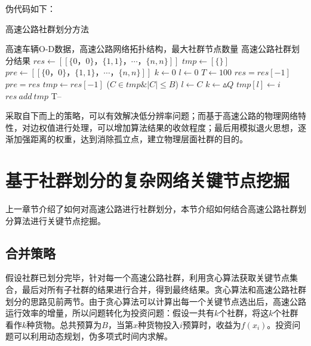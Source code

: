 			伪代码如下：
			\begin{algorithm}[h]
	        \caption{高速公路社群划分方法}  
	        \label{shequn}
	        \begin{algorithmic}[1] %
	            \Require 高速车辆O-D数据，高速公路网络拓扑结构，最大社群节点数量
	            \Ensure 高速公路社群划分结果
	                \State $res\gets [[\{0，0\}，\{1,1\}，\cdots，\{n,n\}]]$ 
	                \State $tmp\gets [\{\}]$
	                \State $pre\gets [[\{0，0\}，\{1,1\}，\cdots，\{n,n\}]]$ 
	                \State $k\gets 0$  
	                \State $l\gets 0$
	                \State $T\gets 100$  
	                	\State $res=res[-1]$
	                	\State $pre=res$
		                	\State $tmp\gets res[-1]$  
		                		\For($C \in tmp \& |C| \le B$)
			                        	\State $l\gets C$  
			                        	\State $k\gets {\vartriangle Q}$  
		                    		\EndIf	
		                		\EndFor
		                    	\State $tmp[l] \gets i$ 
		                	\EndFor
		                	\State $res \ add \ tmp$
	                	\EndWhile
	                	\State T--
	                \EndWhile  
	                \State {}  
	            \EndFunction  
	        \end{algorithmic}  
	    	\end{algorithm} 

			采取自下而上的策略，可以有效解决低分辨率问题；而基于高速公路的物理网络特性，对边权值进行处理，可以增加算法结果的收敛程度；最后用模拟退火思想，逐渐加强距离的权重，达到消除孤立点，建立物理层面社群的目的。

	\section{基于社群划分的复杂网络关键节点挖掘}
		上一章节介绍了如何对高速公路进行社群划分，本节介绍如何结合高速公路社群划分算法进行关键节点挖掘。

		\subsection{合并策略}
			假设社群已划分完毕，针对每一个高速公路社群，利用贪心算法获取关键节点集合，最后对所有子社群的结果进行合并，得到最终结果。贪心算法和高速公路社群划分的思路见前两节。由于贪心算法可以计算出每一个关键节点选出后，高速公路运行效率的增量，所以问题转化为投资问题：假设一共有$k$个社群，将这$k$个社群看作$k$种货物。总共预算为$B$，当第$x$种货物投入$i$预算时，收益为$f(x_i)$。投资问题可以利用动态规划，伪多项式时间内求解。
